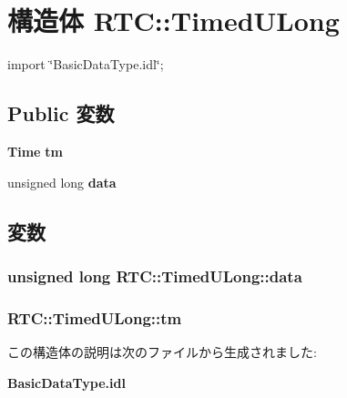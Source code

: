 \section{構造体 RTC::TimedULong}
\label{structRTC_1_1TimedULong}


{\ttfamily import \char`\"{}BasicDataType.idl\char`\"{};}

\subsection*{Public 変数}
\begin{DoxyCompactItemize}
\item 
{\bf Time} {\bf tm}
\item 
unsigned long {\bf data}
\end{DoxyCompactItemize}


\subsection{変数}
\subsubsection[{data}]{\setlength{\rightskip}{0pt plus 5cm}unsigned long {\bf RTC::TimedULong::data}}\label{structRTC_1_1TimedULong_a393f0d18a0039b4a405701d655fec589}
\subsubsection[{tm}]{ {\bf RTC::TimedULong::tm}}\label{structRTC_1_1TimedULong_a187dabc5fbdac2b5c167cecfba5b499e}


この構造体の説明は次のファイルから生成されました:\begin{DoxyCompactItemize}
\item 
{\bf BasicDataType.idl}\end{DoxyCompactItemize}
